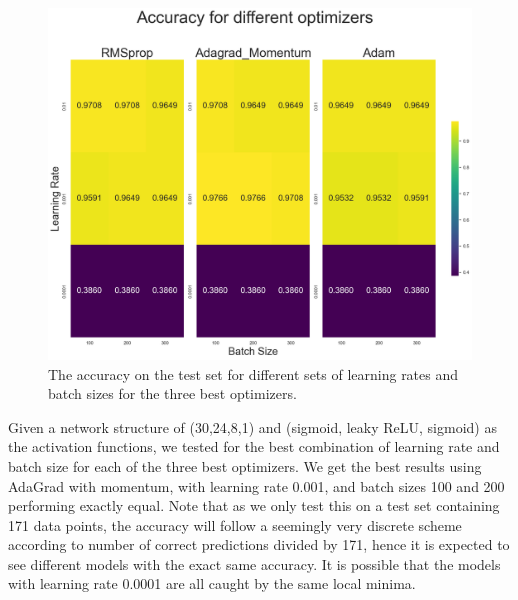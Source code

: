 \begin{figure}[h!]
    \centering
    \includegraphics[width=1.0\linewidth]{project_2/figures/acc_grid_clas.png}
    \caption{The accuracy on the test set for different sets of learning rates and batch sizes for the three best optimizers.}    
    \label{fig:grid_cancer}
\end{figure}

Given a network structure of (30,24,8,1) and (sigmoid, leaky ReLU, sigmoid) as the activation functions, we tested for the best combination of learning rate and batch size for each of the three best optimizers.
We get the best results using AdaGrad with momentum, with learning rate 0.001, and batch sizes 100 and 200 performing exactly equal.
Note that as we only test this on a test set containing 171 data points, the accuracy will follow a seemingly very discrete scheme according to number of correct predictions divided by 171, hence it is expected to see different models with the exact same accuracy.
It is possible that the models with learning rate 0.0001 are all caught by the same local minima.

